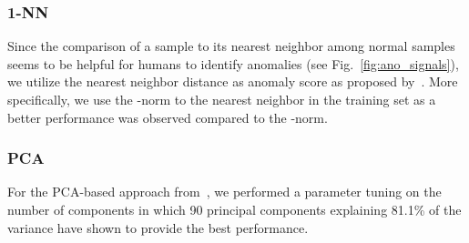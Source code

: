 \documentclass[journal]{IEEEtran}
\begin{document}
\label{sec:baselines}


\subsubsection{1-NN}
Since the comparison of a sample to its nearest neighbor among normal samples seems to be helpful for humans to identify anomalies (see Fig.~\ref{fig:ano_signals}), we utilize the nearest neighbor distance as anomaly score as proposed by~\cite{amer2012nearest}.
More specifically, we use the -norm to the nearest neighbor in the training set as a better performance was observed compared to the -norm.
\subsubsection{PCA}
For the PCA-based approach from~\cite{hornung2014model},
we performed a parameter tuning on the number of components in which 90 principal components explaining 81.1\% of the variance have shown to provide the best performance.
\end{document}
